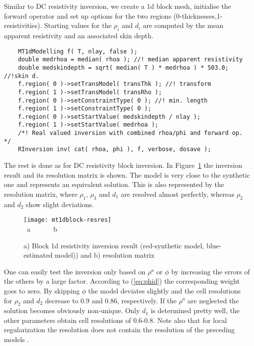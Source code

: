 Similar to DC resistivity inversion, we create a 1d block mesh, initialise the forward operator and set up options for the two regions (0-thicknesses,1-resistivities).
Starting values for the $\rho_i$ and $d_i$ are computed by the mean apparent resistivity and an associated skin depth.
\begin{lstlisting}
    MT1dModelling f( T, nlay, false );
    double medrhoa = median( rhoa ); //! median apparent resistivity
    double medskindepth = sqrt( median( T ) * medrhoa ) * 503.0; //!skin d.
    f.region( 0 )->setTransModel( transThk ); //! transform
    f.region( 1 )->setTransModel( transRho );
    f.region( 0 )->setConstraintType( 0 ); //! min. length
    f.region( 1 )->setConstraintType( 0 );
    f.region( 0 )->setStartValue( medskindepth / nlay );
    f.region( 1 )->setStartValue( medrhoa );
    /*! Real valued inversion with combined rhoa/phi and forward op. */
    RInversion inv( cat( rhoa, phi ), f, verbose, dosave );
\end{lstlisting}

The rest is done as for DC resistivity block inversion.
In Figure~\ref{fig:mt1dblock-resres} the inversion result and its resolution matrix is shown.
The model is very close to the synthetic one and represents an equivalent solution.
This is also represented by the resolution matrix, where $\rho_1$, $\rho_3$ and $d_1$ are resolved almost perfectly, whereas $\rho_2$ and $d_2$ show slight deviations.
\begin{figure}[htbp]
\centering\texttt{[image: mt1dblock-resres]}\\[-3ex]
~\hfill a\hfill ~ \hfill ~~~~~b \hfill ~ \hfill ~ \hfill ~
\caption{a) Block 1d resistivity inversion result (red-synthetic model, blue-estimated model)) and b) resolution matrix}\label{fig:mt1dblock-resres}
\end{figure}

One can easily test the inversion only based on $\rho^a$ or $\phi$ by increasing the errors of the others by a large factor.
According to (\ref{eq:phid}) the corresponding weight goes to zero.
By skipping $\phi$ the model deviates slightly and the cell resolutions for $\rho_2$ and $d_2$ decrease to 0.9 and 0.86, respectively. If the $\rho^a$ are neglected the solution becomes obviously non-unique. Only $d_1$ is determined pretty well, the other parameters obtain cell resolutions of 0.6-0.8. Note also that for local regularization the resolution does not contain the resolution of the preceding models \citep{friedel03}.

